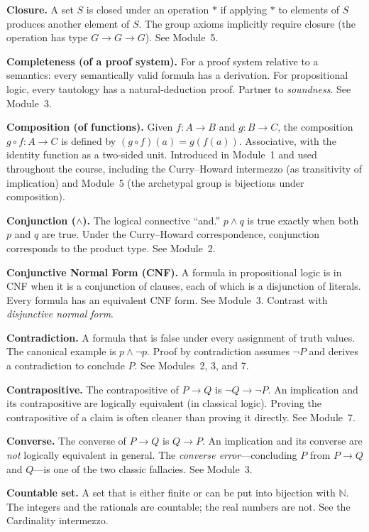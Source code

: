 \documentclass[11pt]{article}
\begin{document}
\textbf{Closure.} A set $S$ is closed under an operation $*$ if applying $*$ to elements of $S$ produces another element of $S$. The group axioms implicitly require closure (the operation has type $G \to G \to G$). See Module~5.

\textbf{Completeness (of a proof system).} For a proof system relative to a semantics: every semantically valid formula has a derivation. For propositional logic, every tautology has a natural-deduction proof. Partner to \emph{soundness}. See Module~3.

\textbf{Composition (of functions).} Given $f : A \to B$ and $g : B \to C$, the composition $g \circ f : A \to C$ is defined by $(g \circ f)(a) = g(f(a))$. Associative, with the identity function as a two-sided unit. Introduced in Module~1 and used throughout the course, including the Curry--Howard intermezzo (as transitivity of implication) and Module~5 (the archetypal group is bijections under composition).

\textbf{Conjunction ($\wedge$).} The logical connective ``and.'' $p \wedge q$ is true exactly when both $p$ and $q$ are true. Under the Curry--Howard correspondence, conjunction corresponds to the product type. See Module~2.

\textbf{Conjunctive Normal Form (CNF).} A formula in propositional logic is in CNF when it is a conjunction of clauses, each of which is a disjunction of literals. Every formula has an equivalent CNF form. See Module~3. Contrast with \emph{disjunctive normal form}.

\textbf{Contradiction.} A formula that is false under every assignment of truth values. The canonical example is $p \wedge \lnot p$. Proof by contradiction assumes $\lnot P$ and derives a contradiction to conclude $P$. See Modules~2, 3, and 7.

\textbf{Contrapositive.} The contrapositive of $P \to Q$ is $\lnot Q \to \lnot P$. An implication and its contrapositive are logically equivalent (in classical logic). Proving the contrapositive of a claim is often cleaner than proving it directly. See Module~7.

\textbf{Converse.} The converse of $P \to Q$ is $Q \to P$. An implication and its converse are \emph{not} logically equivalent in general. The \emph{converse error}---concluding $P$ from $P \to Q$ and $Q$---is one of the two classic fallacies. See Module~3.

\textbf{Countable set.} A set that is either finite or can be put into bijection with $\mathbb{N}$. The integers and the rationals are countable; the real numbers are not. See the Cardinality intermezzo.
\end{document}
